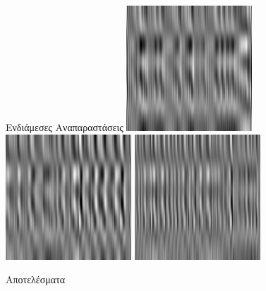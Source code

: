 \documentclass{beamer}
\begin{document}
\begin{frame}[c]{Ενδιάμεσες Αναπαραστάσεις}
	\includegraphics[scale=0.26]{cnn_healthy_area.png}
	\includegraphics[scale=0.26]{cnn_tumor_area.png}
	\includegraphics[scale=0.26]{cnn_epilepsy.png}
\end{frame}

\begin{frame}[c]{Αποτελέσματα}
	\begin{table}
		\scalebox{0.46}{
			\textlatin{
				
				}
				}
	\end{table}
\end{frame}
\end{document}
